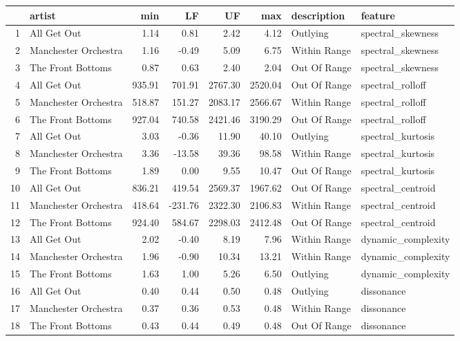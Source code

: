 \documentclass{article}\usepackage[]{graphicx}\usepackage[]{xcolor}
\begin{document}
\begin{table}[ht]
\centering
\begin{tabular}{rlrrrrll}
  \hline
 & artist & min & LF & UF & max & description & feature \\ 
  \hline
1 & All Get Out & 1.14 & 0.81 & 2.42 & 4.12 & Outlying & spectral\_skewness \\ 
  2 & Manchester Orchestra & 1.16 & -0.49 & 5.09 & 6.75 & Within Range & spectral\_skewness \\ 
  3 & The Front Bottoms & 0.87 & 0.63 & 2.40 & 2.04 & Out Of Range & spectral\_skewness \\ 
  4 & All Get Out & 935.91 & 701.91 & 2767.30 & 2520.04 & Out Of Range & spectral\_rolloff \\ 
  5 & Manchester Orchestra & 518.87 & 151.27 & 2083.17 & 2566.67 & Within Range & spectral\_rolloff \\ 
  6 & The Front Bottoms & 927.04 & 740.58 & 2421.46 & 3190.29 & Out Of Range & spectral\_rolloff \\ 
  7 & All Get Out & 3.03 & -0.36 & 11.90 & 40.10 & Outlying & spectral\_kurtosis \\ 
  8 & Manchester Orchestra & 3.36 & -13.58 & 39.36 & 98.58 & Within Range & spectral\_kurtosis \\ 
  9 & The Front Bottoms & 1.89 & 0.00 & 9.55 & 10.47 & Out Of Range & spectral\_kurtosis \\ 
  10 & All Get Out & 836.21 & 419.54 & 2569.37 & 1967.62 & Out Of Range & spectral\_centroid \\ 
  11 & Manchester Orchestra & 418.64 & -231.76 & 2322.30 & 2106.83 & Within Range & spectral\_centroid \\ 
  12 & The Front Bottoms & 924.40 & 584.67 & 2298.03 & 2412.48 & Out Of Range & spectral\_centroid \\ 
  13 & All Get Out & 2.02 & -0.40 & 8.19 & 7.96 & Within Range & dynamic\_complexity \\ 
  14 & Manchester Orchestra & 1.96 & -0.90 & 10.34 & 13.21 & Within Range & dynamic\_complexity \\ 
  15 & The Front Bottoms & 1.63 & 1.00 & 5.26 & 6.50 & Outlying & dynamic\_complexity \\ 
  16 & All Get Out & 0.40 & 0.44 & 0.50 & 0.48 & Outlying & dissonance \\ 
  17 & Manchester Orchestra & 0.37 & 0.36 & 0.53 & 0.48 & Within Range & dissonance \\ 
  18 & The Front Bottoms & 0.43 & 0.44 & 0.49 & 0.48 & Out Of Range & dissonance \\ 

\end{tabular}
\end{table}
\end{document}
